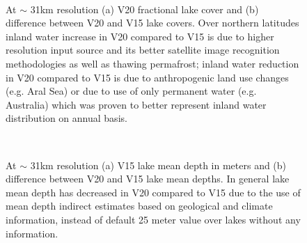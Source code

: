 \documentclass[hess, twostagejnl]{copernicus}
\begin{document}
\begin{figure}
	 \\
	\caption{At $\sim$ 31km resolution (a) V20 fractional lake cover and (b) difference between V20 and V15 lake covers. Over northern latitudes inland water increase in V20 compared to V15 is due to higher resolution input source and its better satellite image recognition methodologies as well as thawing permafrost; inland water reduction in V20 compared to V15 is due to anthropogenic land use changes (e.g. Aral Sea) or due to use of only permanent water (e.g. Australia) which was proven to better represent inland water distribution on annual basis.} 
	\label{fig:example_figure_a}
\end{figure}



\begin{figure}
	 \\
	\caption{At $\sim$ 31km resolution (a) V15 lake mean depth in meters and (b) difference between V20 and V15 lake mean depths. In general lake mean depth has decreased in V20 compared to V15 due to the use of mean depth indirect estimates based on geological and climate information, instead of default 25 meter value over lakes without any information.} 
	\label{fig:example_figure_b}
	\end{figure}
\end{document}

